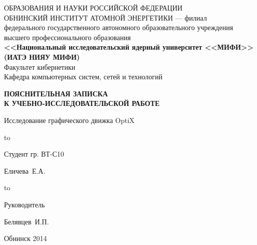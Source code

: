 
\begin{titlepage}
\newpage

\begin{center}
{\small{} ОБРАЗОВАНИЯ И НАУКИ РОССИЙСКОЙ ФЕДЕРАЦИИ\\
ОБНИНСКИЙ ИНСТИТУТ АТОМНОЙ ЭНЕРГЕТИКИ --- филиал}\\
федерального государственного автономного образовательного учреждения\\
высшего профессионального образования\\
{\bf<<Национальный исследовательский ядерный университет <<МИФИ>>\\
(ИАТЭ НИЯУ МИФИ)}\\
\vspace{2em}
Факультет кибернетики\\
Кафедра компьютерных систем, сетей и технологий
\end{center}
\vspace{2em}


\vspace{5em}
\begin{center}
\textbf{ПОЯСНИТЕЛЬНАЯ ЗАПИСКА\\ К УЧЕБНО-ИССЛЕДОВАТЕЛЬСКОЙ РАБОТЕ}
\end{center}


\begin{center}
Исследование графического движка OptiX
\end{center}

\vspace{6em}

\hbox to \textwidth
{\parbox{6 cm}{Студент гр. ВТ-С10}\dotfill \parbox{4 cm}{
\begin{flushright}Еличева~Е.А.\end{flushright}}}
\vspace{2em}

\hbox to \textwidth
{\parbox{6 cm}{Руководитель\\}\dotfill \parbox{4 cm}{
\begin{flushright}Белявцев~И.П.\end{flushright}}}
\vspace{2em}



\vspace{\fill}

\begin{center}
Обнинск 2014
\end{center}

\end{titlepage}